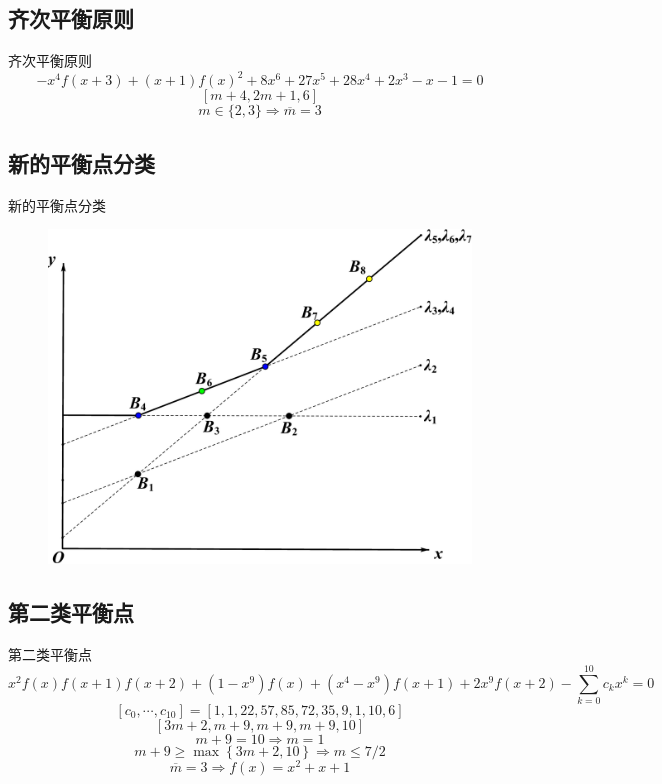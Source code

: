 \documentclass[handout]{beamer}
\newcommand{\bbrace}[1]{\left\{#1\right\}}
\begin{document}
\subsection{齐次平衡原则}
\begin{frame}{齐次平衡原则}
\[
    -x^4f(x+3)+(x+1)f(x)^2+8x^6+27x^5+28x^4+2x^3-x-1=0
\]
\[
    [m+4,2m+1,6]
\]
\[
    m\in \{2,3\} \Rightarrow \overline{m}=3
\]
\end{frame}

\subsection{新的平衡点分类}
\begin{frame}{新的平衡点分类}
\begin{figure}
\centering
\includegraphics[height=0.8\textheight]{../paper/fig/ps.pdf}
\end{figure}
\end{frame}

\subsection{第二类平衡点}
\begin{frame}{第二类平衡点}
\small 
\[
    x^2f(x)f(x+1)f(x+2)+(1-x^9)f(x)+(x^4-x^9)f(x+1)+2x^9f(x+2)-\sum_{k=0}^{10}{c_k x^k}=0
\]
\[
    [c_0,\cdots,c_{10}]=[1,1,22,57,85,72,35,9,1,10,6]
\]
\[
    [3m+2,m+9,m+9,m+9,10]
\]
\[
    m+9=10 \Rightarrow m=1
\]
\[
    m+9 \ge \max\bbrace{3m+2,10} \Rightarrow m\le 7/2
\]
\[
    \overline{m}=3 \Rightarrow f(x)=x^2+x+1
\]
\end{frame}
\end{document}
